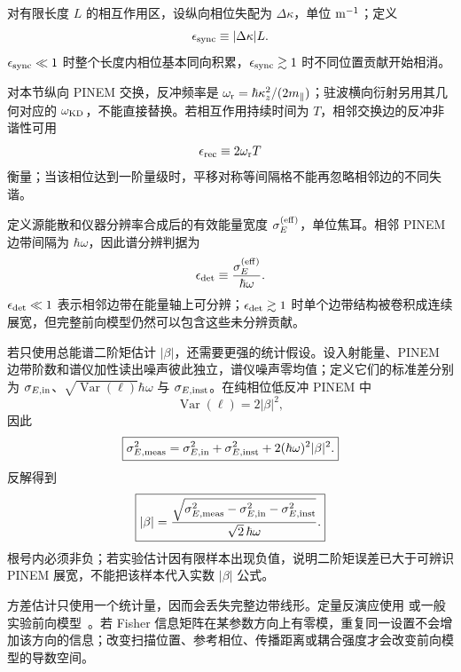 对有限长度 $L$ 的相互作用区，设纵向相位失配为 $\Delta\kappa$，单位 ${\rm m^{-1}}$；定义
\begin{equation*}
\epsilon_{\rm sync}\equiv|\Delta\kappa|L.
\end{equation*}
$\epsilon_{\rm sync}\ll1$ 时整个长度内相位基本同向积累，$\epsilon_{\rm sync}\gtrsim1$ 时不同位置贡献开始相消。

对本节纵向 PINEM 交换，反冲频率是 $\omega_{\rm r}=\hbar\kappa_z^2/(2m_\parallel)$；驻波横向衍射另用其几何对应的 $\omega_{\rm KD}$，不能直接替换。若相互作用持续时间为 $T$，相邻交换边的反冲非谐性可用
\begin{equation*}
\epsilon_{\rm rec}\equiv2\omega_{\rm r}T
\end{equation*}
衡量；当该相位达到一阶量级时，平移对称等间隔格不能再忽略相邻边的不同失谐。

定义源能散和仪器分辨率合成后的有效能量宽度 $\sigma_E^{({\rm eff})}$，单位焦耳。相邻 PINEM 边带间隔为 $\hbar\omega$，因此谱分辨判据为
\begin{equation*}
\epsilon_{\rm det}
\equiv\frac{\sigma_E^{({\rm eff})}}{\hbar\omega}.
\end{equation*}
$\epsilon_{\rm det}\ll1$ 表示相邻边带在能量轴上可分辨；$\epsilon_{\rm det}\gtrsim1$ 时单个边带结构被卷积成连续展宽，但完整前向模型仍然可以包含这些未分辨贡献。

若只使用总能谱二阶矩估计 $|\beta|$，还需要更强的统计假设。设入射能量、PINEM 边带阶数和谱仪加性读出噪声彼此独立，谱仪噪声零均值；定义它们的标准差分别为 $\sigma_{E,{\rm in}}$、$\sqrt{\operatorname{Var}(\ell)}\hbar\omega$ 与 $\sigma_{E,{\rm inst}}$。在纯相位低反冲 PINEM 中
\begin{equation*}
\operatorname{Var}(\ell)=2|\beta|^2,
\end{equation*}
因此
\begin{equation}
\boxed{
\sigma_{E,{\rm meas}}^2
=\sigma_{E,{\rm in}}^2
+\sigma_{E,{\rm inst}}^2
+2(\hbar\omega)^2|\beta|^2.}
\label{eq:pinem_energy_variance_addition}
\end{equation}
反解得到
\begin{equation}
\boxed{
|\beta|
=
\frac{\sqrt{
\sigma_{E,{\rm meas}}^2
-\sigma_{E,{\rm in}}^2
-\sigma_{E,{\rm inst}}^2}}
{\sqrt2\,\hbar\omega}.}
\label{eq:beta_from_variance_experiment}
\end{equation}
根号内必须非负；若实验估计因有限样本出现负值，说明二阶矩误差已大于可辨识 PINEM 展宽，不能把该样本代入实数 $|\beta|$ 公式。

方差估计只使用一个统计量，因而会丢失完整边带线形。定量反演应使用 或一般实验前向模型~。若 Fisher 信息矩阵在某参数方向上有零模，重复同一设置不会增加该方向的信息；改变扫描位置、参考相位、传播距离或耦合强度才会改变前向模型的导数空间。

